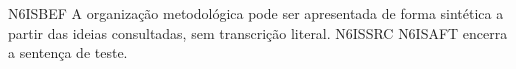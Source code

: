 \documentclass{abntexto-ufc}
\begin{document}
\textual

\noindent N6ISBEF A organização metodológica pode ser apresentada de forma sintética a partir das ideias consultadas, sem transcrição literal. N6ISSRC \cite{silva2020} N6ISAFT encerra a sentença de teste.
\end{document}
